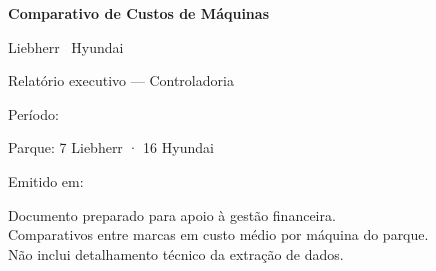 \begin{titlepage}
  \centering
  \vspace*{2cm}

  {\LARGE\bfseries Comparativo de Custos de Máquinas\par}
  \vspace{0.6cm}
  {\Large Liebherr \times\ Hyundai\par}
  \vspace{1.2cm}

  {\large Relatório executivo — Controladoria\par}
  \vspace{0.4cm}
  {\normalsize Período: \daterange\par}
  \vspace{0.2cm}
  {\normalsize Parque: 7 Liebherr · 16 Hyundai\par}
  \vspace{0.3cm}
  {\normalsize Emitido em: \reportdate\par}

  \vfill

  {\small
    Documento preparado para apoio à gestão financeira.\\
    Comparativos entre marcas em custo médio por máquina do parque.\\
    Não inclui detalhamento técnico da extração de dados.
  \par}

  \vspace{0.8cm}
  {\normalsize\textit{\reportcredit}\par}

  \vspace{1.5cm}
\end{titlepage}

\tableofcontents
\newpage
